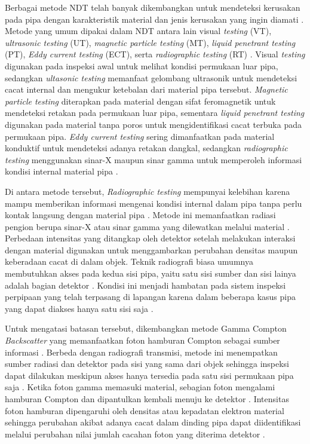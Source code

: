 \documentclass[12pt,a4paper]{report}
\begin{document}
Berbagai metode NDT telah banyak dikembangkan untuk mendeteksi kerusakan pada pipa dengan karakteristik material dan jenis kerusakan yang ingin diamati \cite{wang2024basic}. Metode yang umum dipakai dalam NDT antara lain visual \textit{testing} (VT), \textit{ultrasonic testing} (UT), \textit{magnetic particle testing} (MT), \textit{liquid penetrant testing} (PT), \textit{Eddy current testing} (ECT), serta \textit{radiographic testing} (RT) \cite{Huang2024}. Visual \textit{testing} digunakan pada inspeksi awal untuk melihat kondisi permukaan 
luar pipa, sedangkan \textit{ultasonic testing} memanfaat gelombang ultrasonik untuk mendeteksi cacat internal dan mengukur ketebalan dari material pipa tersebut. \textit{Magnetic particle testing} diterapkan pada material dengan sifat feromagnetik untuk mendeteksi retakan pada permukaan luar pipa, sementara \textit{liquid penetrant testing} digunakan pada material tanpa poros untuk mengidentifikasi cacat terbuka pada permukaan pipa. \textit{Eddy current testing} sering dimanfaatkan pada material konduktif 
untuk mendeteksi adanya retakan dangkal, sedangkan \textit{radiographic testing} menggunakan sinar-X maupun sinar gamma untuk memperoleh informasi kondisi internal material pipa \cite{may2022recent}.

Di antara metode tersebut, \textit{Radiographic testing} mempunyai kelebihan karena mampu memberikan informasi mengenai kondisi internal dalam pipa tanpa perlu kontak langsung dengan material pipa \cite{licata2020depicting}. Metode ini memanfaatkan radiasi pengion berupa sinar-X atau sinar gamma yang dilewatkan melalui material \cite{silva2023review}. Perbedaan intensitas yang ditangkap oleh detektor setelah melakukan interaksi dengan material digunakan untuk menggambarkan perubahan densitas maupun keberadaan cacat di dalam objek. Teknik radiografi biasa umumnya 
membutuhkan akses pada kedua sisi pipa, yaitu satu sisi sumber dan sisi lainya adalah bagian detektor \cite{licata2020depicting}. Kondisi ini menjadi hambatan pada sistem inspeksi perpipaan yang telah terpasang di lapangan karena dalam beberapa kasus pipa yang dapat diakses hanya satu sisi saja .

Untuk mengatasi batasan tersebut, dikembangkan metode Gamma Compton \textit{Backscatter} yang memanfaatkan foton hamburan Compton sebagai sumber informasi \cite{licata2020depicting}. Berbeda dengan radiografi transmisi, metode ini menempatkan sumber radiasi dan detektor pada sisi yang sama dari objek sehingga inspeksi dapat dilakukan meskipun akses hanya tersedia pada satu sisi permukaan pipa saja \cite{licata2020depicting}. Ketika foton gamma memasuki material, sebagian foton mengalami hamburan Compton dan dipantulkan kembali menuju ke detektor \cite{margret2018scales}. Intensitas foton
hamburan dipengaruhi oleh densitas atau kepadatan elektron material sehingga perubahan akibat adanya cacat dalam dinding pipa dapat diidentifikasi melalui perubahan nilai jumlah cacahan foton yang diterima detektor \cite{margret2018scales}.
\end{document}
